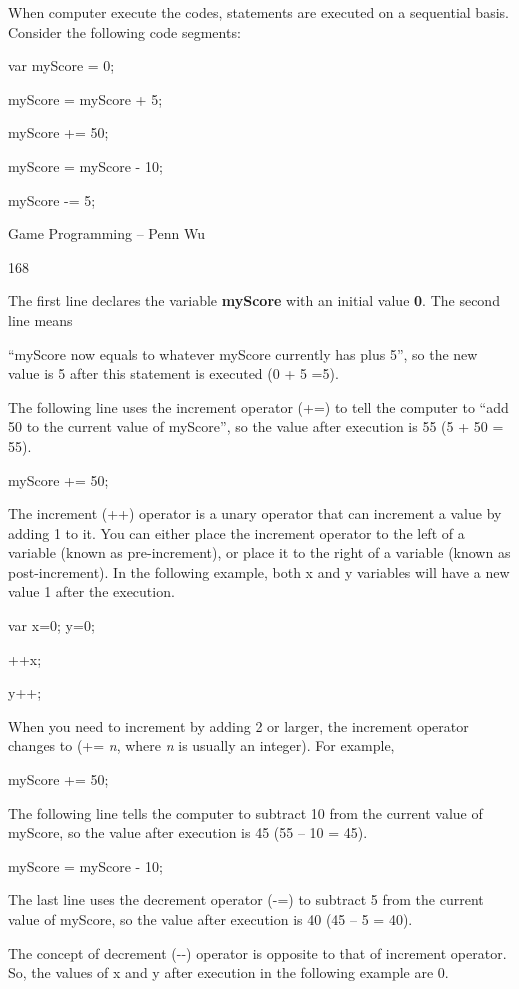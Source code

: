 \documentclass[
]{article}
\begin{document}
When computer execute the codes, statements are executed on a sequential
basis. Consider the following code segments:

var myScore = 0;

myScore = myScore + 5;

myScore += 50;

myScore = myScore - 10;

myScore -= 5;

Game Programming -- Penn Wu

168

\protect\hypertarget{index_split_011.htmlux5cux23p169}{}{}The first line
declares the variable \textbf{myScore} with an initial value \textbf{0}.
The second line means

``myScore now equals to whatever myScore currently has plus 5'', so the
new value is 5 after this statement is executed (0 + 5 =5).

The following line uses the increment operator (+=) to tell the computer
to ``add 50 to the current value of myScore'', so the value after
execution is 55 (5 + 50 = 55).

myScore += 50;

The increment (++) operator is a unary operator that can increment a
value by adding 1 to it. You can either place the increment operator to
the left of a variable (known as pre-increment), or place it to the
right of a variable (known as post-increment). In the following example,
both x and y variables will have a new value 1 after the execution.

var x=0; y=0;

++x;

y++;

When you need to increment by adding 2 or larger, the increment operator
changes to (+= \emph{n}, where \emph{n} is usually an integer). For
example,

myScore += 50;

The following line tells the computer to subtract 10 from the current
value of myScore, so the value after execution is 45 (55 -- 10 = 45).

myScore = myScore - 10;

The last line uses the decrement operator (-=) to subtract 5 from the
current value of myScore, so the value after execution is 40 (45 -- 5 =
40).

The concept of decrement (-\/-) operator is opposite to that of
increment operator. So, the values of x and y after execution in the
following example are 0.
\end{document}
